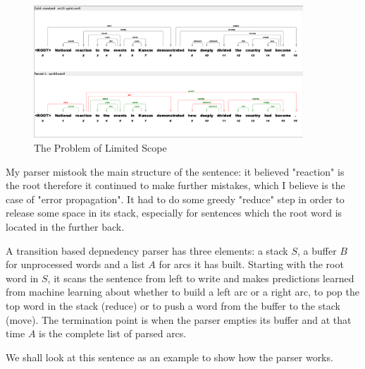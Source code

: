 \documentclass[11pt]{article} %
\begin{document}
\begin{figure}[ht]
  \centering
  \includegraphics[width=0.9\textwidth]{images/figure_limited_scope.png}
  \caption{The Problem of Limited Scope}
\end{figure}

My parser mistook the main structure of the sentence: it believed "reaction" is the root therefore it continued to make further mistakes, which I believe is the case of "error propagation". It had to do some greedy "reduce" step in order to release some space in its stack, especially for sentences which the root word is located in the further back.

A transition based depnedency parser has three elements: a stack $S$, a buffer $B$ for unprocessed words and a list $A$ for arcs it has built. Starting with the root word in $S$, it scans the sentence from left to write and makes predictions learned from machine learning about whether to build a left arc or a right arc, to pop the top word in the stack (reduce) or to push a word from the buffer to the stack (move). The termination point is when the parser empties its buffer and at that time $A$ is the complete list of parsed arcs.

We shall look at this sentence as an example to show how the parser works.
\end{document}
